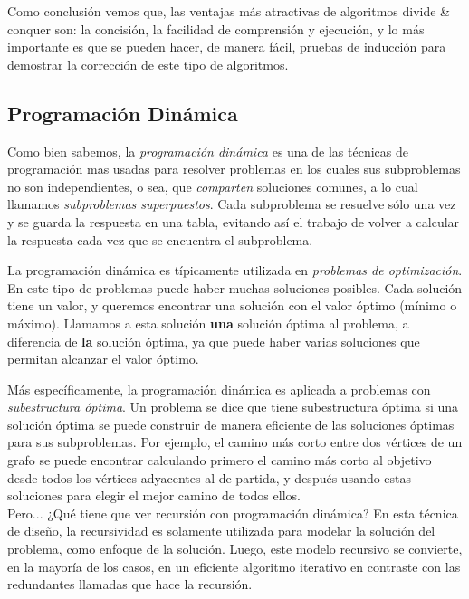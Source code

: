 Como conclusión vemos que, las ventajas más atractivas de algoritmos divide \& conquer son: la concisión, la facilidad de comprensión y
ejecución, y lo más importante es que se pueden hacer, de manera fácil, pruebas de inducción para demostrar la corrección de este tipo de
algoritmos.


\subsection{Programación Dinámica}

Como bien sabemos, la \textit{programación dinámica} es una de las técnicas de programación mas usadas para resolver problemas en los
cuales sus subproblemas no son independientes, o sea, que \textit{comparten} soluciones comunes, a lo cual llamamos \textit{subproblemas
superpuestos}. Cada subproblema se resuelve sólo una vez y se guarda la respuesta en una tabla, evitando así el trabajo de volver a
calcular la respuesta cada vez que se encuentra el subproblema. 

La programación dinámica es típicamente utilizada en \textit{problemas de optimización}. En este tipo de problemas puede haber muchas
soluciones posibles. Cada solución tiene un valor, y queremos encontrar una solución con el valor óptimo (mínimo o máximo). Llamamos
a esta solución \textbf{una} solución óptima al problema, a diferencia de \textbf{la} solución óptima, ya que puede haber varias soluciones
que permitan alcanzar el valor óptimo\cite{cormen09}.

Más específicamente, la programación dinámica es aplicada a problemas con \textit{subestructura óptima}. Un problema se dice que tiene
subestructura óptima si una solución óptima se puede construir de manera eficiente de las soluciones óptimas para sus subproblemas. Por
ejemplo, el camino más corto entre dos vértices de un grafo se puede encontrar calculando primero el camino más corto al objetivo desde
todos los vértices adyacentes al de partida, y después usando estas soluciones para elegir el mejor camino de todos
ellos\cite{bellman10}.\\

Pero... ¿Qué tiene que ver recursión con programación dinámica?
% 
En esta técnica de diseño, la recursividad es solamente utilizada para modelar la solución del problema, como enfoque de la solución. Luego,
este modelo recursivo se convierte, en la mayoría de los casos, en un eficiente algoritmo iterativo en contraste con las redundantes
llamadas que hace la recursión\cite{alsuwaiyel98}.

